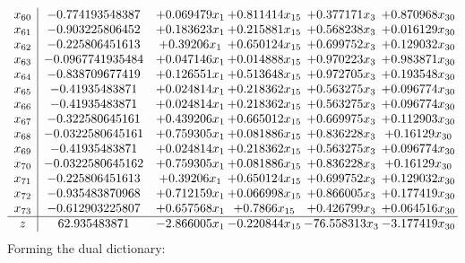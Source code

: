 \documentclass[11pt]{article}
\begin{document}
\[\begin{array}{c| c c@{\hskip 2pt} c@{\hskip 2pt} c@{\hskip 2pt} c@{\hskip 2pt} }
 x_{60}   &  -0.774193548387 & + 0.069479 x_{1} & + 0.811414 x_{15} & + 0.377171 x_{3} & + 0.870968 x_{30}\\
 x_{61}   &  -0.903225806452 & + 0.183623 x_{1} & + 0.215881 x_{15} & + 0.568238 x_{3} & + 0.016129 x_{30}\\
 x_{62}   &  -0.225806451613 & + 0.39206 x_{1} & + 0.650124 x_{15} & + 0.699752 x_{3} & + 0.129032 x_{30}\\
 x_{63}   &  -0.0967741935484 & + 0.047146 x_{1} & + 0.014888 x_{15} & + 0.970223 x_{3} & + 0.983871 x_{30}\\
 x_{64}   &  -0.838709677419 & + 0.126551 x_{1} & + 0.513648 x_{15} & + 0.972705 x_{3} & + 0.193548 x_{30}\\
 x_{65}   &  -0.41935483871 & + 0.024814 x_{1} & + 0.218362 x_{15} & + 0.563275 x_{3} & + 0.096774 x_{30}\\
 x_{66}   &  -0.41935483871 & + 0.024814 x_{1} & + 0.218362 x_{15} & + 0.563275 x_{3} & + 0.096774 x_{30}\\
 x_{67}   &  -0.322580645161 & + 0.439206 x_{1} & + 0.665012 x_{15} & + 0.669975 x_{3} & + 0.112903 x_{30}\\
 x_{68}   &  -0.0322580645161 & + 0.759305 x_{1} & + 0.081886 x_{15} & + 0.836228 x_{3} & + 0.16129 x_{30}\\
 x_{69}   &  -0.41935483871 & + 0.024814 x_{1} & + 0.218362 x_{15} & + 0.563275 x_{3} & + 0.096774 x_{30}\\
 x_{70}   &  -0.0322580645162 & + 0.759305 x_{1} & + 0.081886 x_{15} & + 0.836228 x_{3} & + 0.16129 x_{30}\\
 x_{71}   &  -0.225806451613 & + 0.39206 x_{1} & + 0.650124 x_{15} & + 0.699752 x_{3} & + 0.129032 x_{30}\\
 x_{72}   &  -0.935483870968 & + 0.712159 x_{1} & + 0.066998 x_{15} & + 0.866005 x_{3} & + 0.177419 x_{30}\\
 x_{73}   &  -0.612903225807 & + 0.657568 x_{1} & + 0.7866 x_{15} & + 0.426799 x_{3} & + 0.064516 x_{30}\\
\hline
z    &  62.935483871 & -2.866005 x_{1} & -0.220844 x_{15} & -76.558313 x_{3} & -3.177419 x_{30}\\
\end{array}\]
Forming the dual dictionary:
\end{document}
